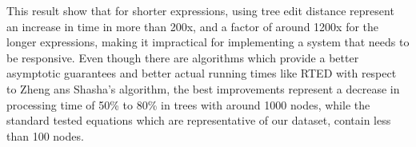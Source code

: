 This result show that for shorter expressions, using tree edit distance represent an increase in time in more than 200x, and a factor of around 1200x for the longer expressions, making it impractical for implementing a system that needs to be responsive. Even though there are algorithms which provide a better asymptotic guarantees and better actual running times like RTED\cite{rted} with respect to Zheng ans Shasha's algorithm, the best improvements represent a decrease in processing time of 50\% to 80\% in trees with around 1000 nodes, while the standard tested equations which are representative of our dataset, contain less than 100 nodes.










